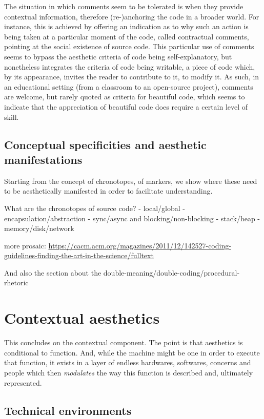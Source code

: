 The situation in which comments seem to be tolerated is when they provide contextual information, therefore (re-)anchoring the code in a broader world. For instance, this is achieved by offering an indication as to why such an action is being taken at a particular moment of the code, called contractual comments, pointing at the social existence of source code. This particular use of comments seems to bypass the aesthetic criteria of code being self-explanatory, but nonetheless integrates the criteria of code being writable, a piece of code which, by its appearance, invites the reader to contribute to it, to modify it. As such, in an educational setting (from a classroom to an open-source project), comments are welcome, but rarely quoted as criteria for beautiful code, which seems to indicate that the appreciation of beautiful code does require a certain level of skill.

\subsection{Conceptual specificities and aesthetic manifestations}
\label{subsec:conceptual-specificities}

Starting from the concept of chronotopes, of markers, we show where these need to be aesthetically manifested in order to facilitate understanding.

What are the chronotopes of source code?
- local/global
- encapsulation/abstraction
- sync/async and blocking/non-blocking
- stack/heap
- memory/disk/network

more prosaic: \url{https://cacm.acm.org/magazines/2011/12/142527-coding-guidelines-finding-the-art-in-the-science/fulltext}

And also the section about the double-meaning/double-coding/procedural-rhetoric

\section{Contextual aesthetics}
\label{sec:contextual-aesthetics}

This concludes on the contextual component. The point is that aesthetics is conditional to function. And, while the machine might be one in order to execute that function, it exists in a layer of endless hardwares, softwares, concerns and people which then \emph{modulates} the way this function is described and, ultimately represented.

\subsection{Technical environments}
\label{subsec:technical-environments}

